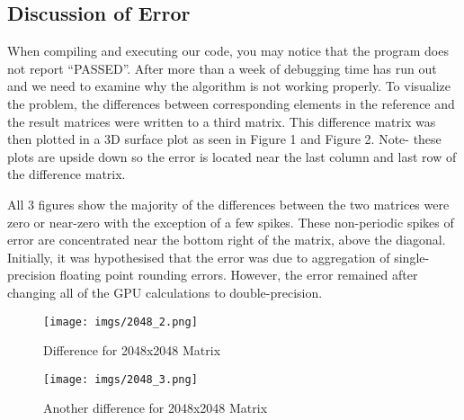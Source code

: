 \documentclass[12pt]{article}
\begin{document}
\pagebreak
\subsection{Discussion of Error}

When compiling and executing our code, you may notice that
the program does not report ``PASSED''. After more than a
week of debugging time has run out and we need to examine
why the algorithm is not working properly. To visualize
the problem, the differences between corresponding elements
in the reference and the result matrices were written to
a third matrix. This difference matrix was then plotted
in a 3D surface plot as seen in Figure 1 and Figure 2.
Note- these plots are upside down so the error is located near
the last column and last row of the difference matrix.

All 3 figures show the majority of the differences between
the two matrices were zero or near-zero with the exception
of a few spikes. These non-periodic spikes of error are concentrated 
near the bottom right of the matrix, above the diagonal.
Initially, it was hypothesised that the error was due to aggregation
of single-precision floating point rounding errors. However,
the error remained after changing all of the GPU calculations to
double-precision.

\begin{figure}[H]
    \centering
    \texttt{[image: imgs/2048\_2.png]}
    \caption{Difference for 2048x2048 Matrix}
\end{figure}


\begin{figure}[H]
    \centering
    \texttt{[image: imgs/2048\_3.png]}
    \caption{Another difference for 2048x2048 Matrix}
\end{figure}
\end{document}
